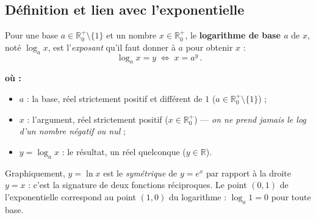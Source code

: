 \documentclass[11pt,a4paper]{article}
\newenvironment{ou}{%
  \par\smallskip\noindent\textbf{où :}\nopagebreak
  \begin{itemize}[leftmargin=1.8em,topsep=2pt,itemsep=1.5pt,parsep=0pt]}%
  {\end{itemize}}
\newcommand{\R}{\mathbb{R}}
\begin{document}
\subsection{Définition et lien avec l'exponentielle}

\begin{definition}
Pour une base $a\in\R_0^{+}\setminus\{1\}$ et un nombre $x\in\R_0^{+}$, le \textbf{logarithme de base $a$}
de $x$, noté $\log_a x$, est l'\emph{exposant} qu'il faut donner à $a$ pour obtenir $x$ :
\[ \boxed{\,\log_a x = y \;\Longleftrightarrow\; x = a^{y}\,}. \]
\begin{ou}
  \item $a$ : la base, réel strictement positif et différent de $1$ ($a\in\R_0^{+}\setminus\{1\}$) ;
  \item $x$ : l'argument, réel strictement positif ($x\in\R_0^{+}$) — \emph{on ne prend jamais le log d'un nombre négatif ou nul} ;
  \item $y=\log_a x$ : le résultat, un réel quelconque ($y\in\R$).
\end{ou}
\end{definition}

\begin{center}
\end{center}

\begin{remarque}
Graphiquement, $y=\ln x$ est le \emph{symétrique} de $y=e^{x}$ par rapport à la droite $y=x$ :
c'est la signature de deux fonctions réciproques. Le point $(0,1)$ de l'exponentielle correspond au
point $(1,0)$ du logarithme : $\log_a 1=0$ pour toute base.
\end{remarque}
\end{document}
